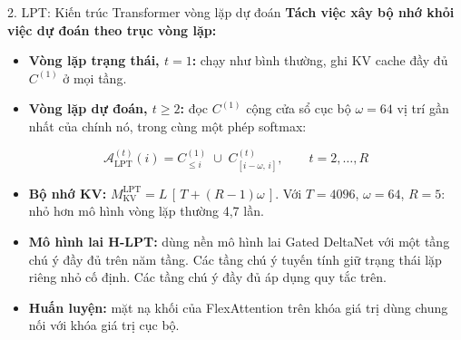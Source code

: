 \begin{frame}{2. LPT: Kiến trúc Transformer vòng lặp dự đoán}
    \textbf{Tách việc xây bộ nhớ khỏi việc dự đoán theo trục vòng lặp:}
    \begin{itemize}
        \item \textbf{Vòng lặp trạng thái, $t=1$:} chạy như bình thường, ghi KV cache đầy đủ $C^{(1)}$ ở mọi tầng.
        \item \textbf{Vòng lặp dự đoán, $t \ge 2$:} đọc $C^{(1)}$ cộng cửa sổ cục bộ $\omega = 64$ vị trí gần nhất của chính nó, trong cùng một phép softmax:
    \end{itemize}
    $$\mathcal{A}_{\text{LPT}}^{(t)}(i) = C^{(1)}_{\le i} \;\cup\; C^{(t)}_{[i-\omega,\, i]}, \qquad t = 2, \dots, R$$
    \begin{itemize}
        \item \textbf{Bộ nhớ KV:} $M_{\text{KV}}^{\text{LPT}} = L\,[\,T + (R-1)\omega\,]$. Với $T = 4096$, $\omega = 64$, $R = 5$: nhỏ hơn mô hình vòng lặp thường 4,7 lần.
        \item \textbf{Mô hình lai H-LPT:} dùng nền mô hình lai Gated DeltaNet với một tầng chú ý đầy đủ trên năm tầng. Các tầng chú ý tuyến tính giữ trạng thái lặp riêng nhỏ cố định. Các tầng chú ý đầy đủ áp dụng quy tắc trên.
        \item \textbf{Huấn luyện:} mặt nạ khối của FlexAttention trên khóa giá trị dùng chung nối với khóa giá trị cục bộ.
    \end{itemize}
\end{frame}

